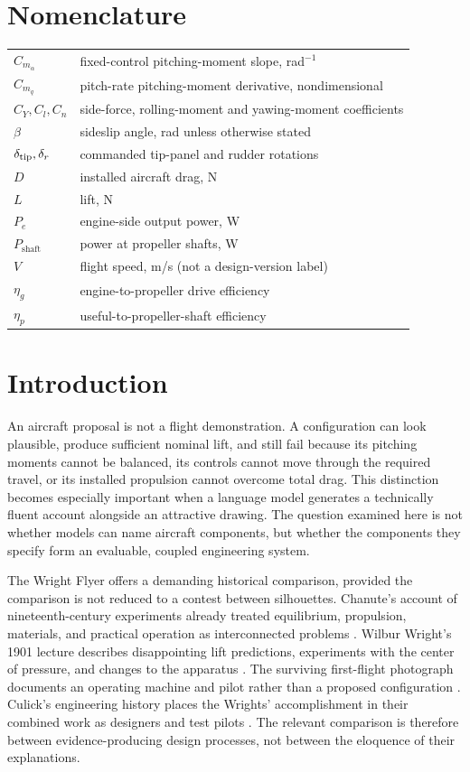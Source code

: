 \documentclass[10pt,letterpaper]{article}
\begin{document}
\section*{Nomenclature}
\noindent\begin{tabular}{@{}ll@{}}
$C_{m_\alpha}$ & fixed-control pitching-moment slope, rad$^{-1}$\\
$C_{m_q}$ & pitch-rate pitching-moment derivative, nondimensional\\
$C_Y,C_l,C_n$ & side-force, rolling-moment and yawing-moment coefficients\\
$\beta$ & sideslip angle, rad unless otherwise stated\\
$\delta_{\rm tip},\delta_r$ & commanded tip-panel and rudder rotations\\
$D$ & installed aircraft drag, N\\
$L$ & lift, N\\
$P_e$ & engine-side output power, W\\
$P_{\mathrm{shaft}}$ & power at propeller shafts, W\\
$V$ & flight speed, m/s (not a design-version label)\\
$\eta_g$ & engine-to-propeller drive efficiency\\
$\eta_p$ & useful-to-propeller-shaft efficiency\\
\end{tabular}

\section{Introduction}
An aircraft proposal is not a flight demonstration. A configuration can look plausible, produce sufficient nominal lift, and still fail because its pitching moments cannot be balanced, its controls cannot move through the required travel, or its installed propulsion cannot overcome total drag. This distinction becomes especially important when a language model generates a technically fluent account alongside an attractive drawing. The question examined here is not whether models can name aircraft components, but whether the components they specify form an evaluable, coupled engineering system.

The Wright Flyer offers a demanding historical comparison, provided the comparison is not reduced to a contest between silhouettes. Chanute's account of nineteenth-century experiments already treated equilibrium, propulsion, materials, and practical operation as interconnected problems \cite{ref1}. Wilbur Wright's 1901 lecture describes disappointing lift predictions, experiments with the center of pressure, and changes to the apparatus \cite{ref2}. The surviving first-flight photograph documents an operating machine and pilot rather than a proposed configuration \cite{ref4}. Culick's engineering history places the Wrights' accomplishment in their combined work as designers and test pilots \cite{ref5}. The relevant comparison is therefore between evidence-producing design processes, not between the eloquence of their explanations.
\end{document}
